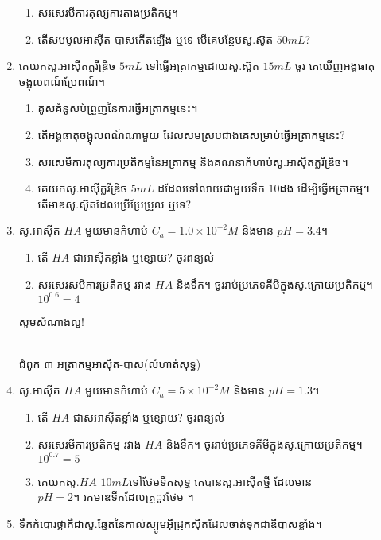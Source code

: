 \documentclass[12pt, a4paper]{article}
\begin{document}
\begin{enumerate}[m]
	\begin{enumerate}[k]
		\item សរសេរមីការតុល្យការតាងប្រតិកម្ម។
		\item តើសមមូលអាស៊ីត បាសកើតឡើង ឬទេ បើគេបន្ថែមសូ.ស៊ូត $50mL$?
	\end{enumerate}
	\item គេយកសូ.អាស៊ីតក្លរីឌ្រិច $5mL$ ទៅធ្វើអត្រាកម្មដោយសូ.ស៊ូត $15mL$ ចូរ គេឃើញអង្គធាតុចង្អុលពណ៍ប្រែពណ៍។
	\begin{enumerate}[k]
		\item គូសគំនូសបំព្រួញនៃការធ្វើអត្រាកម្មនេះ។
		\item តើអង្គធាតុចង្អុលពណ៍ណាមួយ ដែលសមស្របជាងគេសម្រាប់ធ្វើអត្រាកម្មនេះ?
		\item សរសេមីការតុល្យការប្រតិកម្មនៃអត្រាកម្ម និងគណនាកំហាប់សូ.អាស៊ីតក្លរីឌ្រិច។
		\item គេយកសូ.អាស៊ីក្លរីឌ្រិច $5mL$ ដដែលទៅលាយជាមួយទឹក $10$ដង ដើម្បីធ្វើអត្រាកម្ម។ តើមាឌសូ.ស៊ូតដែលប្រើប្រែប្រួល ឬទេ?
	\end{enumerate}
	\item សូ.អាស៊ីត $HA$ មួយមានកំហាប់ $C_a=1.0\times10^{-2}M$ និងមាន $pH=3.4$។
	\begin{enumerate}[k]
		\item តើ $HA$ ជាអាស៊ីតខ្លាំង ឬខ្សោយ? ចូរពន្យល់
		\item សរសេរសមីការប្រតិកម្ម រវាង $HA$ និងទឹក។ ចូររាប់ប្រភេទគីមីក្នុងសូ.ក្រោយប្រតិកម្ម។ $10^{0.6}=4$
	\end{enumerate}
	\begin{center}
		\sffamily\color{black}
		សូមសំណាងល្អ!
	\end{center}\newpage
	\begin{center}
		\sffamily\color{black}
		\\
		ជំពូក ៣ អត្រាកម្មអាស៊ីត-បាស(លំហាត់សុទ្ធ)
	\end{center}
	\item សូ.អាស៊ីត $HA$ មួយមានកំហាប់ $C_a=5\times10^{-2}M$ និងមាន $pH=1.3$។
	\begin{enumerate}[k]
		\item តើ $HA$ ជាសអាស៊ីតខ្លាំង ឬខ្សោយ? ចូរពន្យល់
		\item សរសេរមីការប្រតិកម្ម រវាង $HA$ និងទឹក។ ចូររាប់ប្រភេទគីមីក្នុងសូ.ក្រោយប្រតិកម្ម។ $10^{0.7}=5$
		\item គេយកសូ.$HA$ $10mL$ទៅថែមទឹកសុទ្ធ គេបានសូ.អាស៊ីតថ្មី ដែលមាន\\$pH=2$។  រកមាឌទឹកដែលត្រូូវថែម ។
	\end{enumerate}
	\item ទឹកកំបោរថ្លាគឺជាសូ.ឆ្អែតនៃកាល់ស្យូមអ៊ីដ្រុកស៊ីតដែលចាត់ទុកជាឌីបាសខ្លាំង។

\end{enumerate}
\end{document}
